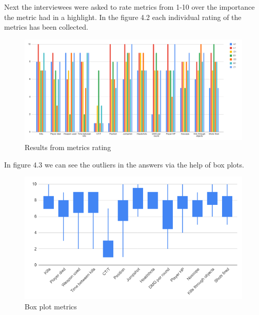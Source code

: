 Next the interviewees were asked to rate metrics from 1-10 over the importance the metric had in a highlight. 
In the figure 4.2 each individual rating of the metrics has been collected.
    \begin{figure}[H]
        \centering
        \includegraphics[width=17cm]{Images/All_results.png}
        \caption{Results from metrics rating}
        \label{fig:Barchart}
    \end{figure}
In figure 4.3 we can see the outliers in the answers via the help of box plots. 
    \begin{figure}[H]
        \centering
        \includegraphics[width=17cm]{Images/boxplot.png}
        \caption{Box plot metrics}
        \label{fig:BoxplotMetrics}
    \end{figure}
